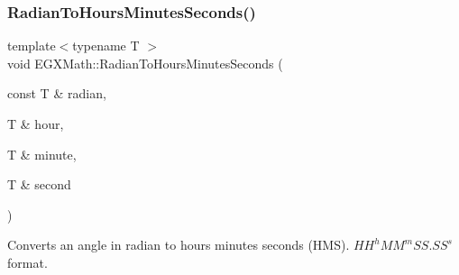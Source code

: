 \mbox{\label{group___e_g_x_math-_angle_conversions-_radian_ga3467598d89af2b8ff68af50b39bb19e2}} 
\subsubsection{\texorpdfstring{Radian\+To\+Hours\+Minutes\+Seconds()}{RadianToHoursMinutesSeconds()}}
{\footnotesize\ttfamily template$<$typename T $>$ \\
void E\+G\+X\+Math\+::\+Radian\+To\+Hours\+Minutes\+Seconds (\begin{DoxyParamCaption}\item[{const T \&}]{radian,  }\item[{T \&}]{hour,  }\item[{T \&}]{minute,  }\item[{T \&}]{second }\end{DoxyParamCaption})}



Converts an angle in radian to hours minutes seconds (H\+MS). ${HH}^h{MM}^m{SS.SS}^s$ format. 

